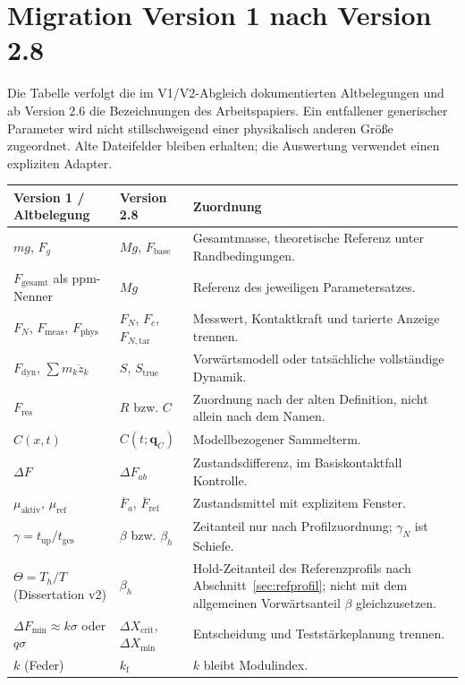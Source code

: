 \documentclass[11pt,a4paper]{article}
\begin{document}
\section{Migration Version 1 nach Version 2.8}\label{app:migration}
Die Tabelle verfolgt die im V1/V2-Abgleich dokumentierten Altbelegungen und ab Version 2.6 die Bezeichnungen des Arbeitspapiers. Ein entfallener generischer Parameter wird nicht stillschweigend einer physikalisch anderen Größe zugeordnet. Alte Dateifelder bleiben erhalten; die Auswertung verwendet einen expliziten Adapter.
\begin{longtable}{@{}L{.27\textwidth}L{.28\textwidth}L{.40\textwidth}@{}}
\toprule\textbf{Version 1 / Altbelegung}&\textbf{Version 2.8}&\textbf{Zuordnung}\\\midrule\endhead
$mg$, $F_g$&$Mg$, $F_{\mathrm{base}}$&Gesamtmasse, theoretische Referenz unter Randbedingungen.\\
$F_{\mathrm{gesamt}}$ als ppm-Nenner&$Mg$&Referenz des jeweiligen Parametersatzes.\\
$F_N$, $F_{\mathrm{meas}}$, $F_{\mathrm{phys}}$&$F_N$, $F_c$, $F_{N,\mathrm{tar}}$&Messwert, Kontaktkraft und tarierte Anzeige trennen.\\
$F_{\mathrm{dyn}}$, $\sum m_k\ddot z_k$&$S$, $S_{\mathrm{true}}$&Vorwärtsmodell oder tatsächliche vollständige Dynamik.\\
$F_{\mathrm{res}}$&$R$ bzw. $C$&Zuordnung nach der alten Definition, nicht allein nach dem Namen.\\
$C(x,t)$&$C(t;\mathbf q_C)$&Modellbezogener Sammelterm.\\
$\Delta F$&$\Delta F_{ab}$&Zustandsdifferenz, im Basiskontaktfall Kontrolle.\\
$\mu_{\mathrm{aktiv}}$, $\mu_{\mathrm{ref}}$&$\overline F_a$, $\overline F_{\mathrm{ref}}$&Zustandsmittel mit explizitem Fenster.\\
$\gamma=t_{\mathrm{up}}/t_{\mathrm{ges}}$&$\beta$ bzw. $\beta_h$&Zeitanteil nur nach Profilzuordnung; $\gamma_N$ ist Schiefe.\\
$\Theta=T_h/T$ (Dissertation v2)&$\beta_h$&Hold-Zeitanteil des Referenzprofils nach Abschnitt~\ref{sec:refprofil}; nicht mit dem allgemeinen Vorwärtsanteil $\beta$ gleichzusetzen.\\
$\Delta F_{\min}\approx k\sigma$ oder $q\sigma$&$\Delta X_{\mathrm{crit}}$, $\Delta X_{\min}$&Entscheidung und Teststärkeplanung trennen.\\
$k$ (Feder)&$k_{\mathrm f}$&$k$ bleibt Modulindex.\\

\end{longtable}
\end{document}
